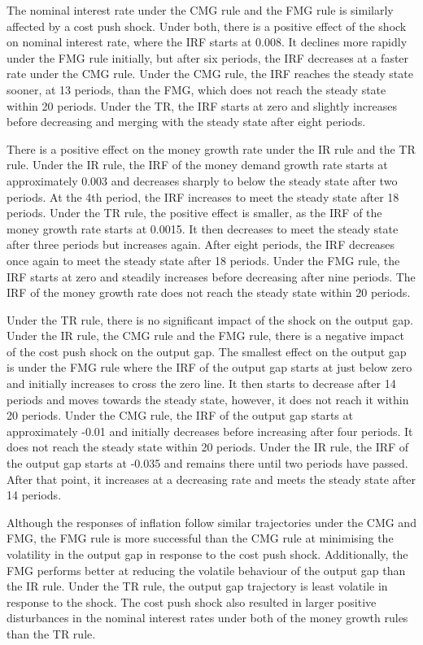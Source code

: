 \documentclass[11pt,preprint, authoryear]{elsarticle}
\numberwithin{equation}{section}
\numberwithin{figure}{section}
\numberwithin{table}{section}
\begin{document}
The nominal interest rate under the CMG rule and the FMG rule is
similarly affected by a cost push shock. Under both, there is a positive
effect of the shock on nominal interest rate, where the IRF starts at
0.008. It declines more rapidly under the FMG rule initially, but after
six periods, the IRF decreases at a faster rate under the CMG rule.
Under the CMG rule, the IRF reaches the steady state sooner, at 13
periods, than the FMG, which does not reach the steady state within 20
periods. Under the TR, the IRF starts at zero and slightly increases
before decreasing and merging with the steady state after eight periods.

There is a positive effect on the money growth rate under the IR rule
and the TR rule. Under the IR rule, the IRF of the money demand growth
rate starts at approximately 0.003 and decreases sharply to below the
steady state after two periods. At the 4th period, the IRF increases to
meet the steady state after 18 periods. Under the TR rule, the positive
effect is smaller, as the IRF of the money growth rate starts at 0.0015.
It then decreases to meet the steady state after three periods but
increases again. After eight periods, the IRF decreases once again to
meet the steady state after 18 periods. Under the FMG rule, the IRF
starts at zero and steadily increases before decreasing after nine
periods. The IRF of the money growth rate does not reach the steady
state within 20 periods.

Under the TR rule, there is no significant impact of the shock on the
output gap. Under the IR rule, the CMG rule and the FMG rule, there is a
negative impact of the cost push shock on the output gap. The smallest
effect on the output gap is under the FMG rule where the IRF of the
output gap starts at just below zero and initially increases to cross
the zero line. It then starts to decrease after 14 periods and moves
towards the steady state, however, it does not reach it within 20
periods. Under the CMG rule, the IRF of the output gap starts at
approximately -0.01 and initially decreases before increasing after four
periods. It does not reach the steady state within 20 periods. Under the
IR rule, the IRF of the output gap starts at -0.035 and remains there
until two periods have passed. After that point, it increases at a
decreasing rate and meets the steady state after 14 periods.

Although the responses of inflation follow similar trajectories under
the CMG and FMG, the FMG rule is more successful than the CMG rule at
minimising the volatility in the output gap in response to the cost push
shock. Additionally, the FMG performs better at reducing the volatile
behaviour of the output gap than the IR rule. Under the TR rule, the
output gap trajectory is least volatile in response to the shock. The
cost push shock also resulted in larger positive disturbances in the
nominal interest rates under both of the money growth rules than the TR
rule.
\end{document}
